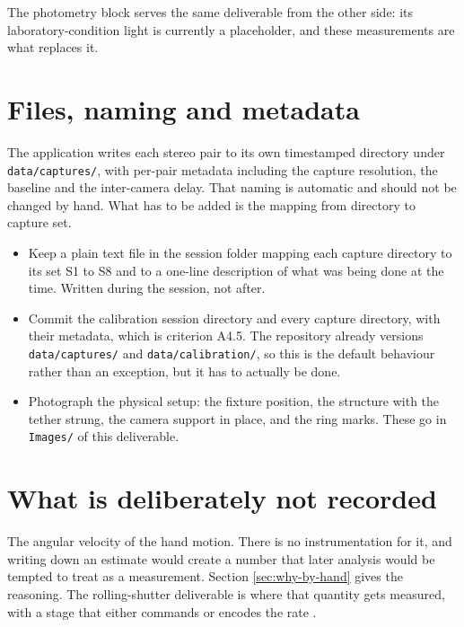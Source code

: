 The photometry block serves the same deliverable from the other side: its
laboratory-condition light is currently a placeholder, and these measurements
are what replaces it.

\section{Files, naming and metadata}

The application writes each stereo pair to its own timestamped directory
under \texttt{data/\allowbreak captures/}, with per-pair metadata including the capture
resolution, the baseline and the inter-camera delay. That naming is
automatic and should not be changed by hand. What has to be added is the
mapping from directory to capture set.

\begin{itemize}
    \item Keep a plain text file in the session folder mapping each capture
    directory to its set S1 to S8 and to a one-line description of what was
    being done at the time. Written during the session, not after.

    \item Commit the calibration session directory and every capture
    directory, with their metadata, which is criterion A4.5. The repository
    already versions \texttt{data/\allowbreak captures/} and
    \texttt{data/\allowbreak calibration/}, so this is the default behaviour rather than
    an exception, but it has to actually be done.

    \item Photograph the physical setup: the fixture position, the structure
    with the tether strung, the camera support in place, and the ring marks.
    These go in \texttt{Images/} of this deliverable.
\end{itemize}

\section{What is deliberately not recorded}

The angular velocity of the hand motion. There is no instrumentation for it,
and writing down an estimate would create a number that later analysis would
be tempted to treat as a measurement. Section \ref{sec:why-by-hand} gives the
reasoning. The rolling-shutter deliverable is where that quantity gets
measured, with a stage that either commands or encodes the rate
\cite{linku_rollingshutter}.
